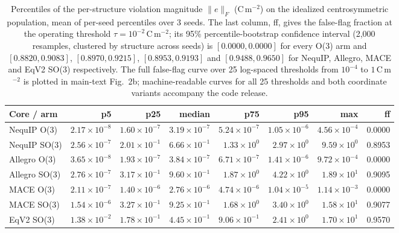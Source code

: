 \begin{table}[htbp]
\centering
\caption{Percentiles of the per-structure violation magnitude $\lVert e \rVert_F$ (C\,m$^{-2}$) on the idealized centrosymmetric population, mean of per-seed percentiles over 3 seeds. The last column, ff, gives the false-flag fraction at the operating threshold $\tau{=}10^{-2}$\,C\,m$^{-2}$; its 95\% percentile-bootstrap confidence interval (2,000 resamples, clustered by structure across seeds) is $[0.0000, 0.0000]$ for every O(3) arm and $[0.8820, 0.9083]$, $[0.8970, 0.9215]$, $[0.8953, 0.9193]$ and $[0.9488, 0.9650]$ for NequIP, Allegro, MACE and EqV2 SO(3) respectively. The full false-flag curve over 25 log-spaced thresholds from $10^{-4}$ to $1$\,C\,m$^{-2}$ is plotted in main-text Fig.~2b; machine-readable curves for all 25 thresholds and both coordinate variants accompany the code release.}
\label{stab:distribution}
\centering
\fontsize{7bp}{8.5bp}\selectfont
\begin{tabular*}{\textwidth}{@{\extracolsep{\fill}}lrrrrrrr@{}}
\toprule
Core / arm & p5 & p25 & median & p75 & p95 & max & ff \\
\midrule
NequIP O(3) & $2.17\times10^{-8}$ & $1.60\times10^{-7}$ & $3.19\times10^{-7}$ & $5.24\times10^{-7}$ & $1.05\times10^{-6}$ & $4.56\times10^{-4}$ & 0.0000 \\
NequIP SO(3) & $2.56\times10^{-7}$ & $2.01\times10^{-1}$ & $6.66\times10^{-1}$ & $1.33\times10^{0}$ & $2.97\times10^{0}$ & $9.59\times10^{0}$ & 0.8953 \\
Allegro O(3) & $3.65\times10^{-8}$ & $1.93\times10^{-7}$ & $3.84\times10^{-7}$ & $6.71\times10^{-7}$ & $1.41\times10^{-6}$ & $9.72\times10^{-4}$ & 0.0000 \\
Allegro SO(3) & $2.76\times10^{-7}$ & $3.17\times10^{-1}$ & $9.60\times10^{-1}$ & $1.87\times10^{0}$ & $4.22\times10^{0}$ & $1.89\times10^{1}$ & 0.9095 \\
MACE O(3) & $2.11\times10^{-7}$ & $1.40\times10^{-6}$ & $2.76\times10^{-6}$ & $4.74\times10^{-6}$ & $1.04\times10^{-5}$ & $1.14\times10^{-3}$ & 0.0000 \\
MACE SO(3) & $1.54\times10^{-6}$ & $3.27\times10^{-1}$ & $9.25\times10^{-1}$ & $1.68\times10^{0}$ & $3.40\times10^{0}$ & $1.58\times10^{1}$ & 0.9077 \\
EqV2 SO(3) & $1.38\times10^{-2}$ & $1.78\times10^{-1}$ & $4.45\times10^{-1}$ & $9.06\times10^{-1}$ & $2.41\times10^{0}$ & $1.70\times10^{1}$ & 0.9570 \\
\bottomrule
\end{tabular*}
\end{table}



